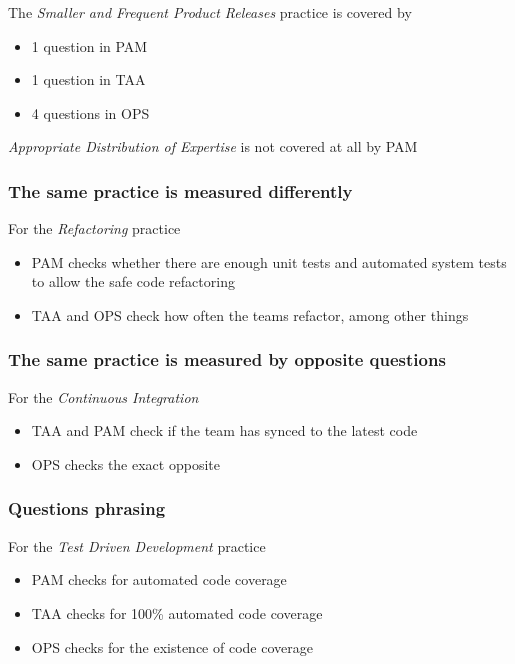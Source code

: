 The \textit{Smaller and Frequent Product Releases} practice is covered by

\begin{itemize}
	\item 1 question in PAM
	\item 1 question in TAA
	\item 4 questions in OPS
\end{itemize}

\textit{Appropriate Distribution of Expertise} is not covered at all by PAM

\clearpage

\subsubsection{The same practice is measured differently}

For the \textit{Refactoring} practice 

\begin{itemize}
	\item PAM checks whether there are enough unit tests and automated system tests to allow the safe code refactoring
	\item TAA and OPS check how often the teams refactor, among other things
\end{itemize}

\clearpage

\subsubsection{The same practice is measured by opposite questions}

For the \textit{Continuous Integration}

\begin{itemize}
	\item TAA and PAM check if the team has synced to the latest code
	\item OPS checks the exact opposite
\end{itemize}

\clearpage

\subsubsection{Questions phrasing}

For the \textit{Test Driven Development} practice

\begin{itemize}
	\item PAM checks for automated code coverage
	\item TAA checks for 100\% automated code coverage
	\item OPS checks for the existence of code coverage
\end{itemize}


